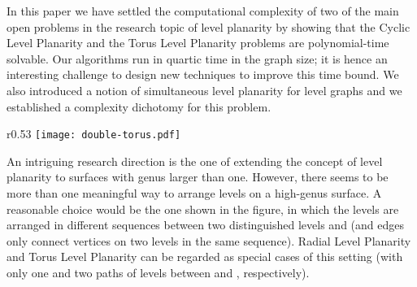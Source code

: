 \documentclass{llncs}
\begin{document}
In this paper we have settled the computational complexity of two of the main open problems in the research topic of level planarity by showing that the {\sc Cyclic Level Planarity} and the {\sc Torus Level Planarity} problems are polynomial-time solvable.
Our algorithms run in quartic time in the graph size; it is hence an interesting challenge to design new techniques to improve this time bound. 
We also introduced a notion of simultaneous level planarity for level graphs and we established a complexity dichotomy for this problem.



\begin{wrapfigure}[5]{r}{0.53\textwidth}
  \vspace{-20pt}
  \centering
\texttt{[image: double-torus.pdf]}
\label{fig:double-torus}
\end{wrapfigure}

An intriguing research direction is the one of extending the concept of level planarity to surfaces with genus larger than one. 
However, there seems to be more than one meaningful way to arrange  levels on a high-genus surface.
A reasonable choice would be the one shown in the figure, in which the levels are arranged in different sequences between two distinguished levels  and  (and edges only connect vertices on two levels in the same sequence). 
{\sc Radial Level Planarity} and {\sc Torus Level Planarity} can be regarded as special cases of this setting (with only one and two paths of levels between  and , respectively). 






\end{document}
